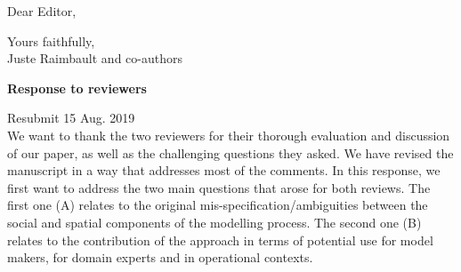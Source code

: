 \documentclass[11pt,a4paper,sans]{moderncv}        %
\begin{document}
\date{\today}
\opening{Dear Editor,}
\closing{Yours faithfully,\\
Juste Raimbault and co-authors%
}




\justify



\medskip






\textbf{Response to reviewers}

Resubmit 15 Aug. 2019\\

We want to thank the two reviewers for their thorough evaluation and discussion of our paper, as well as the challenging questions they asked. We have revised the manuscript in a way that addresses most of the comments. In this response, we first want to address the two main questions that arose for both reviews. The first one (A) relates to the original mis-specification/ambiguities between the social and spatial components of the modelling process. The second one (B) relates to the contribution of the approach in terms of potential use for model makers, for domain experts and in operational contexts.
\end{document}
